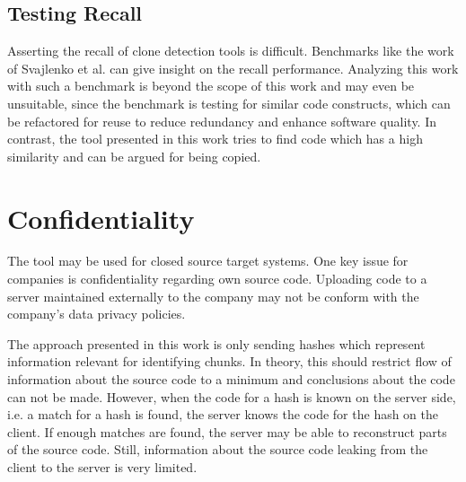 \newpage
\subsection{Testing Recall}
Asserting the recall of clone detection tools is difficult.
Benchmarks like the work of Svajlenko et al. \cite{svajlenko2014towards} can give insight on the recall performance.
Analyzing this work with such a benchmark is beyond the scope of this work and may even be unsuitable, since the benchmark is testing for similar code constructs, which can be refactored for reuse to reduce redundancy and enhance software quality.
In contrast, the tool presented in this work tries to find code which has a high similarity and can be argued for being copied.

\section{Confidentiality}
The tool may be used for closed source target systems.
One key issue for companies is confidentiality regarding own source code.
Uploading code to a server maintained externally to the company may not be conform with the company's data privacy policies.

The approach presented in this work is only sending hashes which represent information relevant for identifying chunks.
In theory, this should restrict flow of information about the source code to a minimum and conclusions about the code can not be made.
However, when the code for a hash is known on the server side, i.e. a match for a hash is found, the server knows the code for the hash on the client.
If enough matches are found, the server may be able to reconstruct parts of the source code.
Still, information about the source code leaking from the client to the server is very limited.